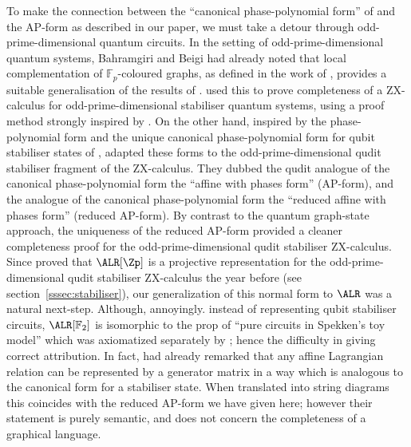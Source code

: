 To make the connection between the ``canonical phase-polynomial form'' of  \textcite{mcelvanney_complete_2022} and the AP-form as described in our paper, we must take a detour through odd-prime-dimensional quantum circuits. In the setting of odd-prime-dimensional quantum systems, Bahramgiri and Beigi \cite{bahramgiri_graph_2007, bahramgiri_efficient_2007} had already noted that local complementation of \(\mathbb{F}_p\)-coloured graphs, as defined in the work of \textcite{kante_rank-width_2013}, provides a suitable generalisation of the results of \textcite{van_den_nest_graphical_2004}.  \textcite{booth_complete_2022} used this to prove completeness of a ZX-calculus for odd-prime-dimensional stabiliser quantum systems, using a proof method strongly inspired by \cite{backens_zx-calculus_2014}. On the other hand, inspired by the phase-polynomial form and the unique canonical  phase-polynomial form for qubit stabiliser states of \textcite{mcelvanney_complete_2022}, \textcite{poor_qupit_2023} adapted these forms to  the odd-prime-dimensional qudit stabiliser fragment of the ZX-calculus.  They dubbed the qudit analogue of the canonical phase-polynomial form the ``affine with phases form'' (AP-form), and the analogue of the canonical phase-polynomial form the ``reduced affine with phases form'' (reduced AP-form). By contrast to the quantum graph-state approach, the uniqueness of the reduced AP-form provided a cleaner completeness proof for the odd-prime-dimensional qudit stabiliser ZX-calculus.
 Since \textcite{comfort_graphical_2021} proved that \(\ALR[\Zp]\)  is a projective representation for the odd-prime-dimensional qudit stabiliser ZX-calculus the year before (see section~\ref{sssec:stabiliser}), our generalization of this normal form to \(\ALR\) was a natural next-step. Although, annoyingly. instead of representing qubit stabiliser circuits, \(\ALR[\mathbb{F}_2]\) is isomorphic to the prop of  ``pure circuits in Spekken's toy model'' which was axiomatized separately by \textcite{spekzx}; hence the difficulty in giving correct attribution.
In fact, \textcite{cockett_categories_2022} had already remarked that any affine Lagrangian relation can be represented by a generator matrix in a way which is  analogous to the canonical form for a stabiliser state. When translated into string diagrams this coincides with the reduced AP-form we have given here;
however their statement is purely semantic, and does not concern the completeness of a graphical language.
